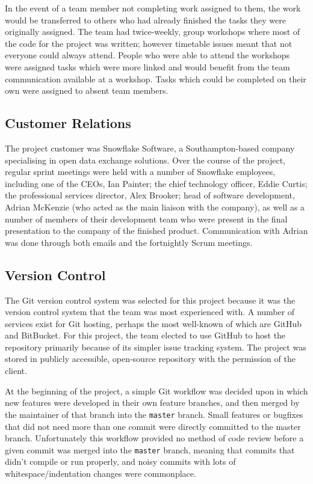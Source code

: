 \documentclass[a4paper, 12pt, twoside]{article}
\begin{document}
In the event of a team member not completing work assigned to them, the work would be transferred to others who had already finished the tasks they were originally assigned. The team had twice-weekly, group workshops where most of the code for the project was written; however timetable issues meant that not everyone could always attend. People who were able to attend the workshops were assigned tasks which were more linked and would benefit from the team communication available at a workshop. Tasks which could be completed on their own were assigned to absent team members.

\subsection{Customer Relations}
\label{sec:plan_customer_relations}

The project customer was Snowflake Software, a Southampton-based company specialising in open data exchange solutions. Over the course of the project, regular sprint meetings were held with a number of Snowflake employees, including one of the CEOs, Ian Painter; the chief technology officer, Eddie Curtis; the professional services director, Alex Brooker; head of software development, Adrian McKenzie (who acted as the main liaison with the company), as well as a number of members of their development team who were present in the final presentation to the company of the finished product. Communication with Adrian was done through both emails and the fortnightly Scrum meetings.

\subsection{Version Control}
\label{sec:version_control}

The Git version control system was selected for this project because it was the version control system that the team was most experienced with. A number of services exist for Git hosting, perhaps the most well-known of which are GitHub and BitBucket. For this project, the team elected to use GitHub to host the repository primarily because of its simpler issue tracking system. The project was stored in publicly accessible, open-source repository with the permission of the client.

At the beginning of the project, a simple Git workflow was decided upon in which new features were developed in their own feature branches, and then merged by the maintainer of that branch into the \texttt{master} branch. Small features or bugfixes that did not need more than one commit were directly committed to the master branch. Unfortunately this workflow provided no method of code review before a given commit was merged into the \texttt{master} branch, meaning that commits that didn't compile or run properly, and noisy commits with lots of whitespace/indentation changes were commonplace.
\end{document}
